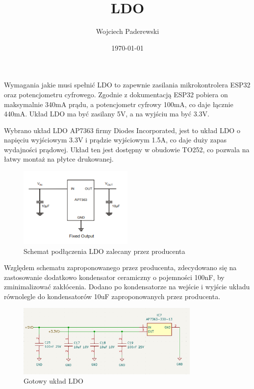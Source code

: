 \documentclass[../../main.tex]{subfiles}
\author{Wojciech Paderewski}
\date{\today}
\title{LDO}
\begin{document}
Wymagania jakie musi spełnić LDO to zapewnie zasilania mikrokontrolera ESP32 oraz potencjometru cyfrowego.
Zgodnie z dokumentacją ESP32\cite{st:esp32} pobiera on maksymalnie 340mA prądu, a potencjometr cyfrowy\cite{st:potencjometr} 100mA,
co daje łącznie 440mA. Układ LDO ma być zasilany 5V, a na wyjściu ma być 3.3V.

Wybrano układ LDO AP7363 firmy Diodes Incorporated\cite{st:ldo}, jest to układ LDO o napięciu wyjściowym 3.3V i prądzie wyjściowym 1.5A,
co daje duży zapas wydajności prądowej. Układ ten jest dostępny w obudowie TO252, co pozwala na łatwy montaż na płytce drukowanej.

\begin{figure}[H]
    \centering
    \includegraphics[width=0.5\textwidth]{ldo_datasheet.png}
    \caption{Schemat podłączenia LDO zalecany przez producenta\cite{st:ldo}}
\end{figure}

Względem schematu zaproponowanego przez producenta, zdecydowano się na zastosowanie dodatkowo kondensator ceramiczny o pojemności 100nF, by zminimalizować zakłócenia.
Dodano po kondensatorze na wejście i wyjście układu równolegle do kondensatorów 10uF zaproponowanych przez producenta.

\begin{figure}[H]
    \centering
    \includegraphics[width=0.8\textwidth]{LDO.png}
    \caption{Gotowy układ LDO}
\end{figure}
\end{document}

